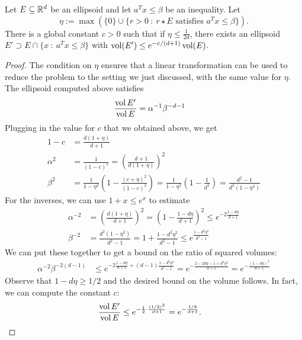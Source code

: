 \begin{lemma}
  Let $E \subseteq \mathbb{R}^d$ be an ellipsoid and let
  $a^Tx \leq \beta$ be an inequality.
  Let
  \[
    \eta := \max(\{ 0 \} \cup \{ r > 0 ~:~ r \star E \text{ satisfies } a^Tx \leq \beta \}).
  \]
  There is a global constant $c > 0$
  such that if $\eta \leq \frac{1}{2d}$,
  there exists an ellipsoid $E' \supset E \cap \{ x ~:~ a^Tx \leq \beta \}$
  with $\operatorname{vol}(E') \leq e^{-c/(d+1)}\operatorname{vol}(E)$.
\end{lemma}
\begin{proof}
  The condition on $\eta$ ensures that a linear transformation can be used to reduce the problem to the setting we just discussed,
  with the same value for $\eta$.
  The ellipsoid computed above satisfies
  \begin{align*}
    \frac{\operatorname{vol} E'}{\operatorname{vol} E}
      &= \alpha^{-1} \beta^{-{d-1}}
  \end{align*}
  Plugging in the value for $c$ that we obtained above, we get
  \begin{align*}
    1 - c &= \frac{d(1 + \eta)}{d + 1} \\
    \alpha^2 &= \frac{1}{(1-c)^2} = \left( \frac{d+1}{d(1+\eta)} \right)^2 \\
    \beta^2 &= \frac{1}{1 - \eta^2} \left( 1 - \frac{(c+\eta)^2}{(1-c)^2} \right) = \frac{1}{1-\eta^2} \left(1 - \frac{1}{d^2} \right) = \frac{d^2 - 1}{d^2(1 - \eta^2)}
  \end{align*}
  For the inverses, we can use $1 + x \leq e^x$ to estimate
  \begin{align*}
    \alpha^{-2} &= \left(\frac{d(1+\eta)}{d+1}\right)^2 = \left(1 - \frac{1 - d\eta}{d+1}\right)^2 \leq e^{-2 \frac{1 - d\eta}{d+1}} \\
    \beta^{-2} &= \frac{d^2(1 - \eta^2)}{d^2 - 1} = 1 + \frac{1 - d^2\eta^2}{d^2-1} \leq e^{\frac{1 - d^2\eta^2}{d^2 - 1}}
  \end{align*}
  We can put these together to get a bound on the ratio of squared volumes:
  \begin{align*}
    \alpha^{-2} \beta^{-2(d-1)}
      &\leq e^{-2 \frac{1-d\eta}{d+1} + (d-1) \frac{1 - d^2\eta^2}{d^2 - 1}}
      = e^{-\frac{2 - 2d\eta - 1 + d^2\eta^2}{d+1}}
      = e^{-\frac{(1 - d\eta)^2}{d+1}}
  \end{align*}
  Observe that $1 - d\eta \geq 1/2$ and the desired bound on the volume follows.
  In fact, we can compute the constant $c$:
  \begin{align*}
    \frac{\vol E'}{\vol E}
    &\leq e^{-\frac{1}{2}\cdot \frac{(1/2)^2}{d+1}} = e^{-\frac{1/8}{d+1}}.

\end{align*}
\end{proof}
